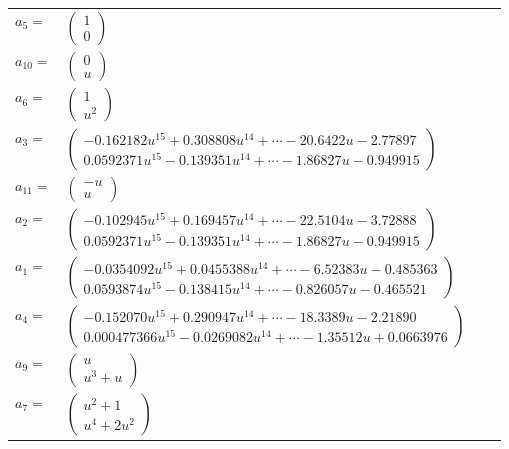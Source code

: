 \documentclass[1p]{elsarticle_modified}
\theoremstyle{definition}
\begin{document}
\begin{tabular}{m{7pt} m{180pt} m{7pt} m{180pt} }
\flushright $a_{5}=$&$\begin{pmatrix}1\\0\end{pmatrix}$ \\
\flushright $a_{10}=$&$\begin{pmatrix}0\\u\end{pmatrix}$ \\
\flushright $a_{6}=$&$\begin{pmatrix}1\\u^2\end{pmatrix}$ \\
\flushright $a_{3}=$&$\begin{pmatrix}-0.162182 u^{15}+0.308808 u^{14}+\cdots-20.6422 u-2.77897\\0.0592371 u^{15}-0.139351 u^{14}+\cdots-1.86827 u-0.949915\end{pmatrix}$ \\
\flushright $a_{11}=$&$\begin{pmatrix}- u\\u\end{pmatrix}$ \\
\flushright $a_{2}=$&$\begin{pmatrix}-0.102945 u^{15}+0.169457 u^{14}+\cdots-22.5104 u-3.72888\\0.0592371 u^{15}-0.139351 u^{14}+\cdots-1.86827 u-0.949915\end{pmatrix}$ \\
\flushright $a_{1}=$&$\begin{pmatrix}-0.0354092 u^{15}+0.0455388 u^{14}+\cdots-6.52383 u-0.485363\\0.0593874 u^{15}-0.138415 u^{14}+\cdots-0.826057 u-0.465521\end{pmatrix}$ \\
\flushright $a_{4}=$&$\begin{pmatrix}-0.152070 u^{15}+0.290947 u^{14}+\cdots-18.3389 u-2.21890\\0.000477366 u^{15}-0.0269082 u^{14}+\cdots-1.35512 u+0.0663976\end{pmatrix}$ \\
\flushright $a_{9}=$&$\begin{pmatrix}u\\u^3+u\end{pmatrix}$ \\
\flushright $a_{7}=$&$\begin{pmatrix}u^2+1\\u^4+2 u^2\end{pmatrix}$ \\

\end{tabular}
\end{document}
